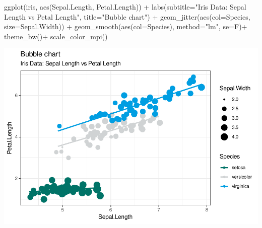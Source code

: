 \documentclass[
]{article}
\newenvironment{Shaded}{\begin{snugshade}}{\end{snugshade}}
\newcommand{\AttributeTok}[1]{\textcolor[rgb]{0.77,0.63,0.00}{#1}}
\newcommand{\FunctionTok}[1]{\textcolor[rgb]{0.00,0.00,0.00}{#1}}
\newcommand{\NormalTok}[1]{#1}
\newcommand{\SpecialCharTok}[1]{\textcolor[rgb]{0.00,0.00,0.00}{#1}}
\newcommand{\StringTok}[1]{\textcolor[rgb]{0.31,0.60,0.02}{#1}}
\begin{document}
\begin{Shaded}
\begin{Highlighting}[]
\FunctionTok{ggplot}\NormalTok{(iris, }\FunctionTok{aes}\NormalTok{(Sepal.Length, Petal.Length)) }\SpecialCharTok{+} 
  \FunctionTok{labs}\NormalTok{(}\AttributeTok{subtitle=}\StringTok{"Iris Data: Sepal Length vs Petal Length"}\NormalTok{,}
       \AttributeTok{title=}\StringTok{"Bubble chart"}\NormalTok{) }\SpecialCharTok{+} 
  \FunctionTok{geom\_jitter}\NormalTok{(}\FunctionTok{aes}\NormalTok{(}\AttributeTok{col=}\NormalTok{Species, }\AttributeTok{size=}\NormalTok{Sepal.Width)) }\SpecialCharTok{+} 
  \FunctionTok{geom\_smooth}\NormalTok{(}\FunctionTok{aes}\NormalTok{(}\AttributeTok{col=}\NormalTok{Species), }\AttributeTok{method=}\StringTok{"lm"}\NormalTok{, }\AttributeTok{se=}\NormalTok{F)}\SpecialCharTok{+}
  \FunctionTok{theme\_bw}\NormalTok{()}\SpecialCharTok{+}
  \FunctionTok{scale\_color\_mpi}\NormalTok{()}
\end{Highlighting}
\end{Shaded}

\begin{center}\includegraphics{figure/scatterPlot-1} \end{center}
\end{document}

